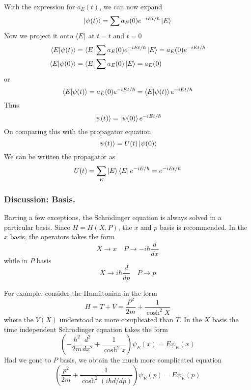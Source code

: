 \documentclass[../../../main.tex]{subfiles}
\begin{document}
With the expression for $a_E(t)$, we can now expand 
\begin{equation*}
    \ket{\psi(t)}=\sum a_E(0)e^{-i E t/\hbar}\ket{E}
\end{equation*}
Now we project it onto $\bra{E }$ at $t=t$ and $t=0$
\begin{align*}
    \braket{E|\psi(t)}&= \bra{E }\sum a_E(0)e^{-i E t/\hbar}\ket{E}=a_E(0)e^{-i Et/\hbar}\\
    \braket{E|\psi(0)}&= \bra{E }\sum a_E(0)\ket{E}=a_E(0)
\end{align*}
or 
\begin{equation*}
    \braket{E|\psi(t)}=a_E(0)e^{-i Et/\hbar}=\braket{E|\psi(t)}e^{-iEt/\hbar}
\end{equation*}
Thus 
\begin{equation*}
    \ket{\psi(t)}=\ket{\psi(0)}e^{-iEt/\hbar}
\end{equation*}
On comparing this with the propagator equation
\begin{equation*}
    \ket{\psi(t)}=U(t)\ket{\psi(0)}    
\end{equation*}
We can be written the propagator as 
\begin{equation*}
    U(t)=\sum_E \ket{E }\bra{E }e^{-iE/\hbar}=e^{-iEt/\hbar}
\end{equation*}

\subsubsection{Discussion: Basis.}
Barring a few exceptions, the Schrödinger equation is always solved in a particular basis.
Since $H=H(X,P)$, the $x$ and $p$ basis is recommended.
In the $x$ basis, the operators takes the form
\begin{equation*}
    X \rightarrow x \quad P \rightarrow -i \hbar \frac{d }{dx} 
\end{equation*}
while in $P$ basis
\begin{equation*}
    X \rightarrow i \hbar \frac{d }{dp}\quad P \rightarrow p 
\end{equation*}

For example, consider the Hamiltonian in the form
\begin{equation*}
    H=T+V=\frac{P^2 }{2m }+\frac{1 }{\cosh^2 X}
\end{equation*}
where the $V(X)$ understood as more complicated than $T$.
In the $X$ basis the time independent Schrödinger equation takes the form 
\begin{equation*}
    \left( -\frac{\hbar^2 }{2m }\frac{d^2 }{dx^2 }+\frac{1 }{\cosh^2 x} \right) \psi_E(x)=E\psi_E(x)
\end{equation*}
Had we gone to $P$ basis, we obtain the much more complicated equation
\begin{equation*}
    \left( \frac{p^2 }{2m }+\frac{1 }{\cosh^2 (i \hbar d/dp)} \right) \psi_E(p)=E\psi_E(p)
\end{equation*}
\end{document}

